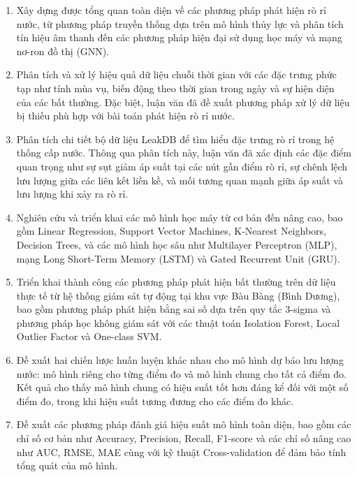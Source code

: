 \begin{enumerate}
    \item Xây dựng được tổng quan toàn diện về các phương pháp phát hiện rò rỉ nước, từ phương pháp truyền thống dựa trên mô hình thủy lực và phân tích tín hiệu âm thanh đến các phương pháp hiện đại sử dụng học máy và mạng nơ-ron đồ thị (GNN).
    
    \item Phân tích và xử lý hiệu quả dữ liệu chuỗi thời gian với các đặc trưng phức tạp như tính mùa vụ, biến động theo thời gian trong ngày và sự hiện diện của các bất thường. Đặc biệt, luận văn đã đề xuất phương pháp xử lý dữ liệu bị thiếu phù hợp với bài toán phát hiện rò rỉ nước.
    
    \item Phân tích chi tiết bộ dữ liệu LeakDB để tìm hiểu đặc trưng rò rỉ trong hệ thống cấp nước. Thông qua phân tích này, luận văn đã xác định các đặc điểm quan trọng như sự sụt giảm áp suất tại các nút gần điểm rò rỉ, sự chênh lệch lưu lượng giữa các liên kết liền kề, và mối tương quan mạnh giữa áp suất và lưu lượng khi xảy ra rò rỉ.
    
    \item Nghiên cứu và triển khai các mô hình học máy từ cơ bản đến nâng cao, bao gồm Linear Regression, Support Vector Machines, K-Nearest Neighbors, Decision Trees, và các mô hình học sâu như Multilayer Perceptron (MLP), mạng Long Short-Term Memory (LSTM) và Gated Recurrent Unit (GRU).
    
    \item Triển khai thành công các phương pháp phát hiện bất thường trên dữ liệu thực tế từ hệ thống giám sát tự động tại khu vực Bàu Bàng (Bình Dương), bao gồm phương pháp phát hiện bằng sai số dựa trên quy tắc 3-sigma và phương pháp học không giám sát với các thuật toán Isolation Forest, Local Outlier Factor và One-class SVM.
    
    \item Đề xuất hai chiến lược huấn luyện khác nhau cho mô hình dự báo lưu lượng nước: mô hình riêng cho từng điểm đo và mô hình chung cho tất cả điểm đo. Kết quả cho thấy mô hình chung có hiệu suất tốt hơn đáng kể đối với một số điểm đo, trong khi hiệu suất tương đương cho các điểm đo khác.
    
    \item Đề xuất các phương pháp đánh giá hiệu suất mô hình toàn diện, bao gồm các chỉ số cơ bản như Accuracy, Precision, Recall, F1-score và các chỉ số nâng cao như AUC, RMSE, MAE cùng với kỹ thuật Cross-validation để đảm bảo tính tổng quát của mô hình.
\end{enumerate}


